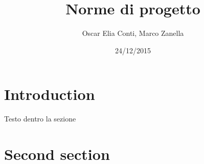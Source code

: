 \documentclass[a4paper,twoside,12pt]{article}
\title{Norme di progetto}
\author{Oscar Elia Conti, Marco Zanella}
\date{24/12/2015}
\begin{document}
\maketitle

\section{Introduction}
Testo dentro la sezione


\section{Second section}
\end{document}
